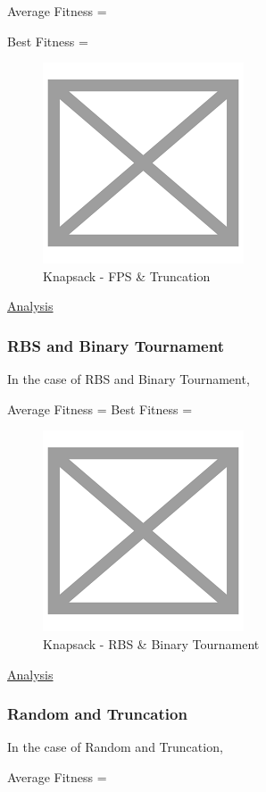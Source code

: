 \documentclass[11pt, letterpaper]{article}
\begin{document}
Average Fitness = 

Best Fitness = 
\begin{figure}[H]
    \centering
    \includegraphics[scale = 0.6]{images/placeHolder.png}
    \caption {Knapsack - FPS \& Truncation}
    \label {fig:gcFT}
\end{figure}

\underline{Analysis}
\subsubsection {RBS and Binary Tournament}
In the case of RBS and Binary Tournament,

Average Fitness = 
Best Fitness = 

\begin{figure}[H]
    \centering
    \includegraphics[scale = 0.6]{images/placeHolder.png}
    \caption {Knapsack - RBS \& Binary Tournament}
    \label {fig:gcRB}
\end{figure}

\underline{Analysis}
\subsubsection {Random and Truncation}
In the case of Random and Truncation,

Average Fitness = 
\end{document}
